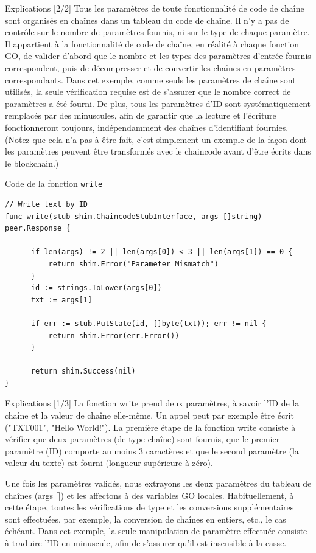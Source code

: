 \documentclass[presentation]{beamer}
\begin{document}
\begin{frame}[label={sec:org047f2da}]{Explications [2/2]}
Tous les paramètres de toute fonctionnalité de code de chaîne sont organisés en chaînes 
dans un tableau du code de chaîne. Il n'y a pas de contrôle sur le nombre de paramètres 
fournis, ni sur le type de chaque paramètre. Il appartient à la fonctionnalité de code 
de chaîne, en réalité à chaque fonction GO, de valider d’abord que le nombre et les 
types des paramètres d’entrée fournis correspondent, puis de décompresser et de convertir 
les chaînes en paramètres correspondants. Dans cet exemple, comme seuls les paramètres de 
chaîne sont utilisés, la seule vérification requise est de s'assurer que le nombre correct 
de paramètres a été fourni. De plus, tous les paramètres d'ID sont systématiquement remplacés 
par des minuscules, afin de garantir que la lecture et l'écriture fonctionneront toujours, 
indépendamment des chaînes d'identifiant fournies. (Notez que cela n’a pas à être fait, c’est
simplement un exemple de la façon dont les paramètres peuvent être transformés avec le chaincode 
avant d’être écrits dans le blockchain.)
\end{frame}
\begin{frame}[fragile,label={sec:orgf3456c8}]{Code de la fonction \texttt{write}}
 \begin{verbatim}
// Write text by ID
func write(stub shim.ChaincodeStubInterface, args []string) peer.Response {

      if len(args) != 2 || len(args[0]) < 3 || len(args[1]) == 0 {
	      return shim.Error("Parameter Mismatch")
      }
      id := strings.ToLower(args[0])
      txt := args[1]

      if err := stub.PutState(id, []byte(txt)); err != nil {
	      return shim.Error(err.Error())
      }

      return shim.Success(nil)
}
\end{verbatim}
\end{frame}
\begin{frame}[label={sec:org7b88762}]{Explications [1/3]}
La fonction write prend deux paramètres, à savoir l'ID de la chaîne et la valeur de chaîne elle-même. 
Un appel peut par exemple être écrit ("TXT001", "Hello World!"). 
La première étape de la fonction write consiste à vérifier que deux paramètres (de type chaîne) sont 
fournis, que le premier paramètre (ID) comporte au moins 3 caractères et que le second paramètre (la 
valeur du texte) est fourni (longueur supérieure à zéro).

Une fois les paramètres validés, nous extrayons les deux paramètres du tableau de chaînes (args [])
et les affectons à des variables GO locales. Habituellement, à cette étape, toutes les vérifications 
de type et les conversions supplémentaires sont effectuées, par exemple, la conversion de chaînes en 
entiers, etc., le cas échéant. Dans cet exemple, la seule manipulation de paramètre effectuée consiste 
à traduire l'ID en minuscule, afin de s'assurer qu'il est insensible à la casse.
\end{frame}
\end{document}
